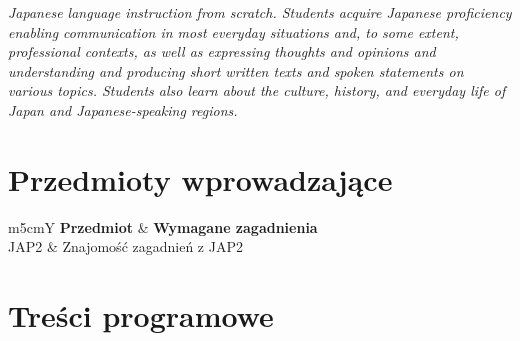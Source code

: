 \documentclass[12pt, a4paper]{article}
\newcommand{\thdrule}{\noalign{\global\setlength{\extrarowheight}{0pt}}}
\newcommand{\thdend}{\noalign{\global\setlength{\extrarowheight}{3pt}}}
\begin{document}
\textit{Japanese language instruction from scratch. Students acquire Japanese proficiency enabling communication in most everyday situations and, to some extent, professional contexts, as well as expressing thoughts and opinions and understanding and producing short written texts and spoken statements on various topics. Students also learn about the culture, history, and everyday life of Japan and Japanese-speaking regions.}


\section{Przedmioty wprowadzające}

{\scriptsize
\begin{tabularx}{\textwidth}{m{5cm}Y}
\thdrule\toprule
{} {\color{white}\textbf{Przedmiot}} & {\color{white}\textbf{Wymagane zagadnienia}} \\
\midrule\thdend
   JAP2 & Znajomość zagadnień z JAP2 \\
\bottomrule
\end{tabularx}}

\section{Treści programowe}
\end{document}
